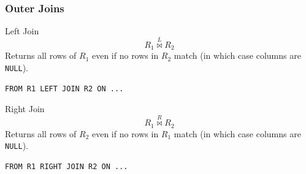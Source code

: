 \subsubsection{Outer Joins}
\begin{tcbraster}[raster columns=2, raster equal height]
    \begin{definitionbox}{Left Join}
        \[R_1 \overset{L}{\bowtie} R_2\]
        Returns all rows of $R_1$ even if no rows in $R_2$ match (in which case columns are \texttt{NULL}).
        
            \begin{center}
            \end{center}
            \begin{verbatim}
FROM R1 LEFT JOIN R2 ON ... 
            \end{verbatim}
    \end{definitionbox}
    \begin{definitionbox}{Right Join}
        \[R_1 \overset{R}{\bowtie} R_2\]
        Returns all rows of $R_2$ even if no rows in $R_1$ match (in which case columns are \texttt{NULL}).
            \begin{center}
            \end{center}
            \begin{verbatim}
FROM R1 RIGHT JOIN R2 ON ... 
            \end{verbatim}
    \end{definitionbox}
\end{tcbraster}
